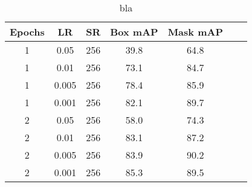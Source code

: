 
\begin{table}
	\centering
	\caption[Detection evaluation]{bla}
	\label{tab:detection_eval1}
	\begin{tabular}[H!]{ccccccc}
		\toprule
		\textbf{Epochs} & \textbf{LR} & \textbf{SR} & \textbf{Box mAP} & \textbf{Mask mAP} \\
		\midrule
		1               & 0.05        & 256         & 39.8             & 64.8              \\
		1               & 0.01        & 256         & 73.1             & 84.7              \\
		1               & 0.005       & 256         & 78.4             & 85.9              \\
		1               & 0.001       & 256         & 82.1             & 89.7              \\
		2               & 0.05        & 256         & 58.0             & 74.3              \\
		2               & 0.01        & 256         & 83.1             & 87.2              \\
		2               & 0.005       & 256         & 83.9             & 90.2              \\
		2               & 0.001       & 256         & 85.3             & 89.5              \\
		\bottomrule
	\end{tabular}
\end{table}

